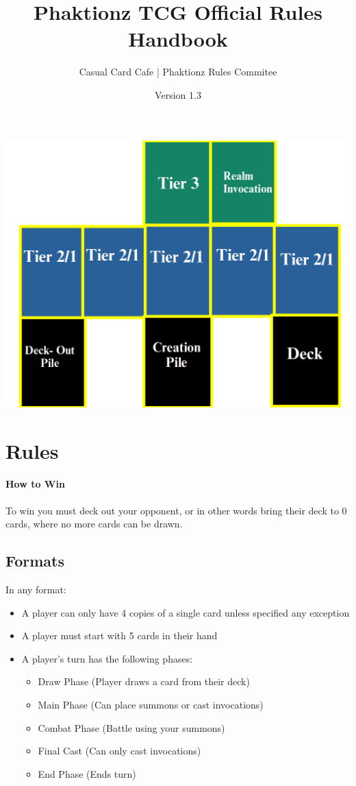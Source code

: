 \documentclass[12pt, letterpaper]{article}
\title{Phaktionz TCG Official Rules Handbook}
\author{Casual Card Cafe | Phaktionz Rules Commitee}
\date{Version 1.3}
\begin{document}
\maketitle
{}
\newpage
\tableofcontents
\newpage
\begin{center}
    \includegraphics[scale = 0.25]{field.png}
\end{center}


\section{Rules}
\paragraph{How to Win\\}
To win you must deck out your opponent, or in other words bring their deck to 0 cards, where no more cards can be drawn.
\subsection{Formats}
In any format: 
\begin{itemize}
    \item A player can only have 4 copies of a single card unless specified any exception
    \item A player must start with 5 cards in their hand 
    \item A player's turn has the following phases:
     \begin{itemize}
        \item Draw Phase (Player draws a card from their deck)
        \item Main Phase (Can place summons or cast invocations)
        \item Combat Phase (Battle using your summons)
        \item Final Cast (Can only cast invocations)
        \item End Phase (Ends turn)
     \end{itemize}
\end{itemize}
\end{document}

